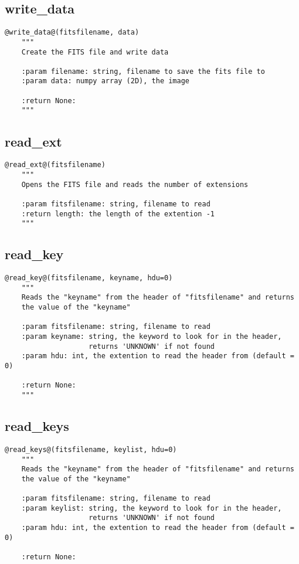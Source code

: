 \subsection{write\_data}
\begin{lstlisting}[style=pythonstyle]
@write_data@(fitsfilename, data)
    """
    Create the FITS file and write data

    :param filename: string, filename to save the fits file to
    :param data: numpy array (2D), the image

    :return None:
    """
\end{lstlisting}

\vspace{0.5cm}
\subsection{read\_ext}
\begin{lstlisting}[style=pythonstyle]
@read_ext@(fitsfilename)
    """
    Opens the FITS file and reads the number of extensions

    :param fitsfilename: string, filename to read
    :return length: the length of the extention -1
    """
\end{lstlisting}

\vspace{0.5cm}
\subsection{read\_key}
\begin{lstlisting}[style=pythonstyle]
@read_key@(fitsfilename, keyname, hdu=0)
    """
    Reads the "keyname" from the header of "fitsfilename" and returns
    the value of the "keyname"

    :param fitsfilename: string, filename to read
    :param keyname: string, the keyword to look for in the header,
                    returns 'UNKNOWN' if not found
    :param hdu: int, the extention to read the header from (default = 0)

    :return None:
    """
\end{lstlisting}

\vspace{0.5cm}
\subsection{read\_keys}
\begin{lstlisting}[style=pythonstyle]
@read_keys@(fitsfilename, keylist, hdu=0)
    """
    Reads the "keyname" from the header of "fitsfilename" and returns
    the value of the "keyname"

    :param fitsfilename: string, filename to read
    :param keylist: string, the keyword to look for in the header,
                    returns 'UNKNOWN' if not found
    :param hdu: int, the extention to read the header from (default = 0)

    :return None:
\end{lstlisting}

